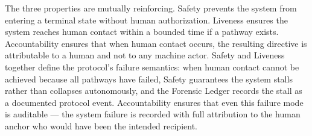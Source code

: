 The three properties are mutually reinforcing. Safety prevents the system from entering a terminal state without human authorization. Liveness ensures the system reaches human contact within a bounded time if a pathway exists. Accountability ensures that when human contact occurs, the resulting directive is attributable to a human and not to any machine actor. Safety and Liveness together define the protocol's failure semantics: when human contact cannot be achieved because all pathways have failed, Safety guarantees the system stalls rather than collapses autonomously, and the Forensic Ledger records the stall as a documented protocol event. Accountability ensures that even this failure mode is auditable — the system failure is recorded with full attribution to the human anchor who would have been the intended recipient.
